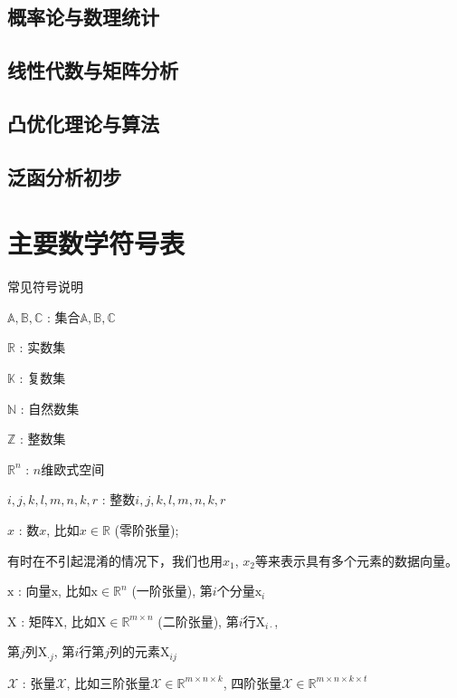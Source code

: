\documentclass[UTF8,12pt]{ctexart}
\begin{document}
\subsection{概率论与数理统计}

\subsection{线性代数与矩阵分析}

\subsection{凸优化理论与算法}

\subsection{泛函分析初步}

\newpage
\section{主要数学符号表}

{\centering 常见符号说明}

\vspace{5mm}

$\mathbb{A,B,C}$ : \qquad 集合$\mathbb{A,B,C}$

$\mathbb{R}$ : \qquad 实数集

$\mathbb{K}$ : \qquad 复数集

$\mathbb{N}$ : \qquad 自然数集

$\mathbb{Z}$ : \qquad 整数集


$\mathbb{R}^n$ : \qquad  $n$维欧式空间

$\mathit{i,j,k,l,m,n,k,r}$ : \qquad 整数$\mathit{i,j,k,l,m,n,k,r}$

$\mathit{x}$ : \qquad 数$\mathit{x}$, 比如$\mathit{x} \in \mathbb{R}$ (零阶张量);

\qquad 有时在不引起混淆的情况下，我们也用$\mathit{x}_1$, $\mathit{x}_2$等来表示具有多个元素的数据向量。

$\mathrm{x}$ : \qquad 向量$\mathrm{x}$, 比如$\mathrm{x} \in \mathbb{R}^n$ (一阶张量), 第$i$个分量$\mathrm{x}_i$

$\mathrm{X}$ :  \qquad 矩阵$\mathrm{X}$, 比如$\mathrm{X} \in \mathbb{R}^{m \times n}$ (二阶张量), 第$i$行$\mathrm{X}_{i \cdot}$,

  \qquad \qquad 第$j$列$\mathrm{X}_{\cdot j}$, 第$i$行第$j$列的元素$\mathrm{X}_{ij}$

$\mathcal{X}$ : \qquad 张量$\mathcal{X}$, 比如三阶张量$\mathcal{X} \in \mathbb{R}^{m \times n \times k}$, 四阶张量$\mathcal{X} \in
\mathbb{R}^{m \times n \times k \times t}$
\end{document}
